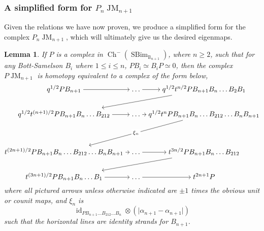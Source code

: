 \documentclass[11pt]{article}
\DeclareMathOperator{\id}{id}
\DeclareMathOperator{\Ch}{Ch}
\DeclareMathOperator{\SBim}{SBim}
\DeclareMathOperator{\JM}{JM}
\newtheorem{lemma}[thm]{Lemma}
\theoremstyle{definition}
\theoremstyle{remark}
\numberwithin{equation}{section}
\begin{document}
\subsubsection{A simplified form for $P_n\JM_{n+1}$}
Given the relations we have now proven, we produce a simplified form for the
complex $P_n\JM_{n+1}$, which will ultimately give us the desired eigenmaps.
\begin{lemma}
	\label{lem:pjmsimplified}
	If $P$ is a complex in $\Ch^-(\SBim_{\mathbb{B}_{n+1}})$, where
	$n \geq 2$, such that for
	any Bott-Samelson $B_i$ where $1\leq i \leq n$, $PB_i\simeq B_iP\simeq
	0$, then the complex $P\JM_{n+1}$ is homotopy equivalent to a complex of
	the form below,
\[\begin{tikzcd}[ampersand replacement=\&,cramped, column sep=tiny]
	{q^{1/2}PB_{n+1}} \& \dots \& {q^{1/2}t^{n/2}PB_{n+1}B_n\dots B_2B_1} \\
	{q^{1/2}t^{(n+1)/2}PB_{n+1}B_n\dots B_{212}} \& \dots \& {q^{1/2}t^{n}PB_{n+1}B_n\dots B_{212}\dots B_{n}B_{n+1}} \\
	\\
	{t^{(2n+1)/2}PB_{n+1}B_n\dots B_{212}\dots B_{n}B_{n+1}} \& \dots \& {t^{3n/2}PB_{n+1}B_n\dots B_{212}} \\
	{t^{(3n+1)/2}PB_{n+1}B_n\dots B_1} \& \dots \& {t^{2n+1}P}
	\arrow[from=1-1, to=1-2]
	\arrow[from=1-2, to=1-3]
	\arrow[from=1-3, to=2-1]
	\arrow[from=2-1, to=2-2]
	\arrow[from=2-2, to=2-3]
	\arrow["\xi_n"{description}, from=2-3, to=4-1]
	\arrow[from=4-1, to=4-2]
	\arrow[from=4-2, to=4-3]
	\arrow[from=4-3, to=5-1]
	\arrow[from=5-1, to=5-2]
	\arrow[from=5-2, to=5-3]
\end{tikzcd}\]
	where all pictured arrows unless otherwise indicated are
	$\pm 1$ times the obvious
	unit or counit maps, and $\xi_n$ is
	\[
\id_{PB_{n+1}\dots B_{212}\dots B_n}\otimes \left(\mathbf{\big\vert}
	 \alpha_{n+1}-\alpha_{n+1}\mathbf{\big\vert}\right)
	\]
	such that the horizontal lines are
	identity strands for $B_{n+1}$.
\end{lemma}
\end{document}
